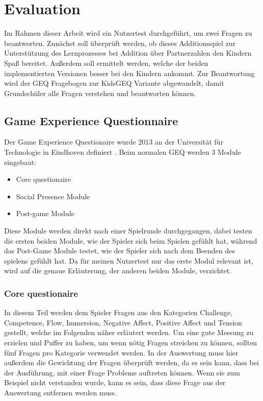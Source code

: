 \chapter{Evaluation} %
Im Rahmen dieser Arbeit wird ein Nutzertest durchgeführt, um zwei Fragen zu beantworten. Zunächst soll überprüft werden, ob dieses Additionsspiel zur Unterstützung des Lernprozesses bei Addition über Partnerzahlen den Kindern Spaß bereitet. Außerdem soll ermittelt werden, welche der beiden implementierten Versionen besser bei den Kindern ankommt. Zur Beantwortung wird der GEQ Fragebogen zur KidsGEQ\cite{Poels2008b} Variante abgewandelt, damit Grundschüler alle Fragen verstehen und beantworten können.
\section{Game Experience Questionnaire}
Der Game Experience Questionaire wurde 2013 an der Universität für Technologie in Eindhoven definiert \cite{IJsselsteijn2013}.
Beim normalen GEQ werden 3 Module eingebaut:
\begin{itemize}
\item Core questionaire
\item Social Presence Module
\item Post-game Module
\end{itemize}
Diese Module werden direkt nach einer Spielrunde durchgegangen, dabei testen die ersten beiden Module, wie der Spieler sich beim Spielen gefühlt hat, während das Post-Game Module testet, wie der Spieler sich nach dem Beenden des spielens gefühlt hat. Da für meinen Nutzertest nur das erste Modul relevant ist, wird auf die genaue Erläuterung, der anderen beiden Module, verzichtet.
\subsection{Core questionaire}
In diesem Teil werden dem Spieler Fragen aus den Kategorien Challenge, Competence, Flow, Immersion, Negative Affect, Positive Affect und Tension gestellt, welche im Folgenden näher erläutert werden. Um eine gute Messung zu erzielen und Puffer zu haben, um wenn nötig Fragen streichen zu können, sollten fünf Fragen pro Kategorie verwendet werden. In der Auswertung muss hier außerdem die Gewichtung der Fragen überprüft werden, da es sein kann, dass bei der Ausführung, mit einer Frage Probleme auftreten können. Wenn sie zum Beispiel nicht verstanden wurde, kann es sein, dass diese Frage aus der Auswertung entfernen werden muss.
